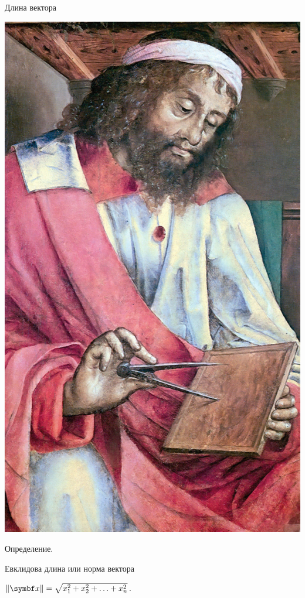 \begin{frame}{Длина вектора}




\begin{minipage}{0.3\textwidth}%
\includegraphics[scale=0.2]{figures/video_010_euklid.jpg}
\end{minipage}%
\hfill%
\begin{minipage}{0.6\textwidth}
Определение. 

\alert{Евклидова длина} или \alert{норма} вектора 

$\norm{\bx} = \sqrt{x_1^2 + x_2^2 + \ldots + x_n^2}$.
\end{minipage}





\end{frame}



